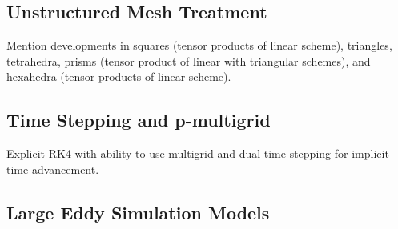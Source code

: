 

\subsection{Unstructured Mesh Treatment}
Mention developments in squares (tensor products of linear scheme), triangles\cite{castonguay2012new,williams2013tri}, tetrahedra\cite{williams2013tet}, prisms (tensor product of linear with triangular schemes), and hexahedra (tensor products of linear scheme).

\subsection{Time Stepping and p-multigrid}
Explicit RK4 with ability to use multigrid\cite{fidkowski2005p} and dual time-stepping\cite{Jameson1991DualTime} for implicit time advancement.


\subsection{Large Eddy Simulation Models}\label{lesmodels}

